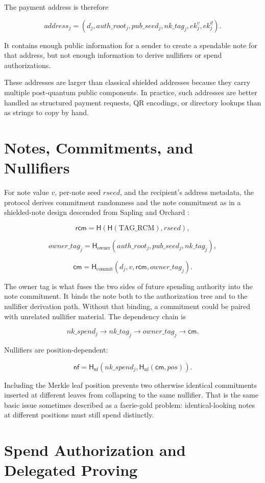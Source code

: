 \documentclass[11pt]{article}
\newcommand{\Hash}{\mathsf{H}}
\newcommand{\cm}{\mathsf{cm}}
\newcommand{\nf}{\mathsf{nf}}
\newcommand{\rcm}{\mathsf{rcm}}
\begin{document}
The payment address is therefore

\[
address_j = (d_j, auth\_root_j, pub\_seed_j, nk\_tag_j, ek^v_j, ek^d_j).
\]

It contains enough public information for a sender to create a spendable note
for that address, but not enough information to derive nullifiers or spend
authorizations.

These addresses are larger than classical shielded addresses because they carry
multiple post-quantum public components. In practice, such addresses are better
handled as structured payment requests, QR encodings, or directory lookups than
as strings to copy by hand.

\section{Notes, Commitments, and Nullifiers}

For note value \(v\), per-note seed \(rseed\), and the recipient's address
metadata, the protocol derives commitment randomness and the note commitment as
in a shielded-note design descended from Sapling and Orchard
\cite{zcash-protocol,zcash-orchard}:

\[
\rcm = \Hash(\Hash(\mathrm{TAG\_RCM}), rseed),
\]

\[
owner\_tag_j = \Hash_{\mathrm{owner}}(auth\_root_j, pub\_seed_j, nk\_tag_j),
\]

\[
\cm = \Hash_{\mathrm{commit}}(d_j, v, \rcm, owner\_tag_j).
\]

The owner tag is what fuses the two sides of future spending authority into the
note commitment. It binds the note both to the authorization tree and to the
nullifier derivation path. Without that binding, a commitment could be paired
with unrelated nullifier material. The dependency chain is

\[
nk\_spend_j \rightarrow nk\_tag_j \rightarrow owner\_tag_j \rightarrow \cm.
\]

Nullifiers are position-dependent:

\[
\nf = \Hash_{\mathrm{nf}}(nk\_spend_j, \Hash_{\mathrm{nf}}(\cm, pos)).
\]

Including the Merkle leaf position prevents two otherwise identical commitments
inserted at different leaves from collapsing to the same nullifier. That is the
same basic issue sometimes described as a faerie-gold problem: identical-looking
notes at different positions must still spend distinctly.

\section{Spend Authorization and Delegated Proving}
\end{document}
